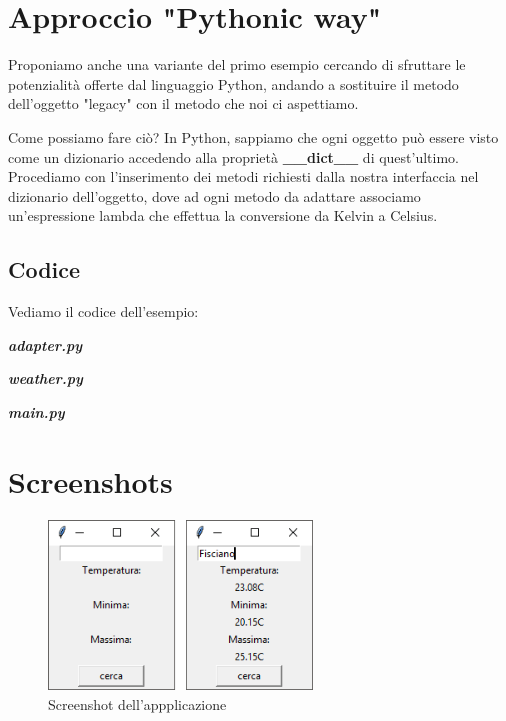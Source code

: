   \section{Approccio "Pythonic way"}
  
  Proponiamo anche una variante del primo esempio cercando di sfruttare le 
  potenzialità offerte dal linguaggio Python, andando a sostituire il metodo 
  dell'oggetto "legacy" con il metodo che noi ci aspettiamo. 
  
  Come possiamo fare ciò? In Python, sappiamo che ogni oggetto può essere 
  visto come un dizionario accedendo alla proprietà \textbf{\_\_dict\_\_}
  di quest'ultimo.
  Procediamo con l'inserimento dei metodi richiesti dalla nostra interfaccia 
  nel dizionario dell'oggetto, dove ad ogni metodo da adattare associamo un'espressione
  lambda che effettua la conversione da Kelvin a Celsius.
  
  \subsection{Codice}
  
  Vediamo il codice dell'esempio:
  
  \textbf{\textit{adapter.py}}
  
  
  \textbf{\textit{weather.py}}
  
  
  \textbf{\textit{main.py}}
  
  
  \section{Screenshots}
  
  \begin{figure}[htbp]
    \begin{center}
      \includegraphics[width=7cm]{img/screen/screen_1.png}
    \end{center}
    \caption{Screenshot dell'appplicazione}
    \label{fig:dessin}
  \end{figure}